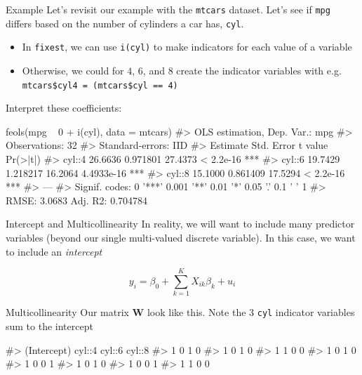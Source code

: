 \documentclass[aspectratio=169,t,11pt,table]{beamer}
\begin{document}
\begin{frame}{Example}
  Let's revisit our example with the \texttt{mtcars} dataset. Let's see if \texttt{mpg} differs based on the number of cylinders a car has, \texttt{cyl}. 

  \begin{itemize}
    \item In \texttt{fixest}, we can use \texttt{i(cyl)} to make indicators for each value of a variable

    \item Otherwise, we could for $4$, $6$, and $8$ create the indicator variables with e.g. \texttt{mtcars\$cyl4 = (mtcars\$cyl == 4)}
  \end{itemize}
\end{frame}

\begin{frame}[fragile]{}
  Interpret these coefficients:

  \begin{codeblock}
feols(mpg ~ 0 + i(cyl), data = mtcars)
#> OLS estimation, Dep. Var.: mpg
#> Observations: 32
#> Standard-errors: IID 
#>        Estimate Std. Error t value   Pr(>|t|)    
#> cyl::4  26.6636   0.971801 27.4373  < 2.2e-16 ***
#> cyl::6  19.7429   1.218217 16.2064 4.4933e-16 ***
#> cyl::8  15.1000   0.861409 17.5294  < 2.2e-16 ***
#> ---
#> Signif. codes:  0 '***' 0.001 '**' 0.01 '*' 0.05 '.' 0.1 ' ' 1
#> RMSE: 3.0683   Adj. R2: 0.704784
  \end{codeblock}
\end{frame}

\begin{frame}{Intercept and Multicollinearity}
  In reality, we will want to include many predictor variables (beyond our single multi-valued discrete variable). 
  In this case, we want to include an \emph{intercept}

  \bigskip
  $$
    y_i = \beta_0 + \sum_{k=1}^K X_{ik} \beta_k + u_i
  $$
\end{frame}

\begin{frame}[fragile]{Multicollinearity}
  Our matrix $\bm{W}$ look like this. Note the 3 \texttt{cyl} indicator variables sum to the intercept
  \begin{codeblock}
#> (Intercept)   cyl::4   cyl::6   cyl::8
#>           1        0        1        0
#>           1        0        1        0
#>           1        1        0        0
#>           1        0        1        0
#>           1        0        0        1
#>           1        0        1        0
#>           1        0        0        1
#>           1        1        0        0
  \end{codeblock}
\end{frame}
\end{document}
